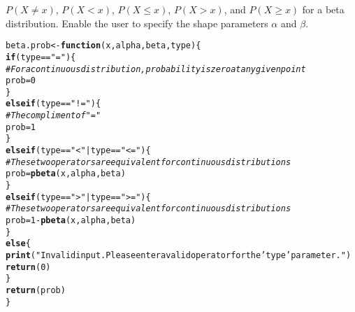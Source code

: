 \documentclass{article}\usepackage[]{graphicx}\usepackage[]{xcolor}
\makeatletter
\newcommand{\hlnum}[1]{\textcolor[rgb]{0.686,0.059,0.569}{#1}}%
\newcommand{\hlsng}[1]{\textcolor[rgb]{0.192,0.494,0.8}{#1}}%
\newcommand{\hlcom}[1]{\textcolor[rgb]{0.678,0.584,0.686}{\textit{#1}}}%
\newcommand{\hlopt}[1]{\textcolor[rgb]{0,0,0}{#1}}%
\newcommand{\hldef}[1]{\textcolor[rgb]{0.345,0.345,0.345}{#1}}%
\newcommand{\hlkwa}[1]{\textcolor[rgb]{0.161,0.373,0.58}{\textbf{#1}}}%
\newcommand{\hlkwb}[1]{\textcolor[rgb]{0.69,0.353,0.396}{#1}}%
\newcommand{\hlkwc}[1]{\textcolor[rgb]{0.333,0.667,0.333}{#1}}%
\newcommand{\hlkwd}[1]{\textcolor[rgb]{0.737,0.353,0.396}{\textbf{#1}}}%
\newenvironment{kframe}{%
 \def\at@end@of@kframe{}%
 \ifinner\ifhmode%
  \def\at@end@of@kframe{\end{minipage}}%
  \begin{minipage}{\columnwidth}%
 \fi\fi%
 \def\FrameCommand##1{\hskip\@totalleftmargin \hskip-\fboxsep
 \colorbox{shadecolor}{##1}\hskip-\fboxsep
     \hskip-\linewidth \hskip-\@totalleftmargin \hskip\columnwidth}%
 \MakeFramed {\advance\hsize-\width
   \@totalleftmargin\z@ \linewidth\hsize
   \@setminipage}}%
 {\par\unskip\endMakeFramed%
 \at@end@of@kframe}
\newenvironment{knitrout}{}{} %
\makeatother
\begin{document}
\begin{enumerate}
    $P(X \neq x)$, $P(X<x)$, $P(X \leq x)$, $P(X > x)$, and $P(X \geq x)$
    for a beta distribution. Enable the user to specify the shape parameters
    $\alpha$ and $\beta$.
\begin{knitrout}\scriptsize
{}\color{fgcolor}\begin{kframe}
\begin{alltt}
\hldef{beta.prob} \hlkwb{<-} \hlkwa{function}\hldef{(}\hlkwc{x}\hldef{,} \hlkwc{alpha}\hldef{,} \hlkwc{beta}\hldef{,} \hlkwc{type}\hldef{)\{}
  \hlkwa{if}\hldef{(type} \hlopt{==} \hlsng{"="}\hldef{)\{}
    \hlcom{#For a continuous distribution, probability is zero at any given point}
    \hldef{prob} \hlkwb{=} \hlnum{0}
  \hldef{\}}
  \hlkwa{else if}\hldef{(type} \hlopt{==} \hlsng{"!="}\hldef{)\{}
    \hlcom{#The compliment of "="}
    \hldef{prob} \hlkwb{=} \hlnum{1}
  \hldef{\}}
  \hlkwa{else if}\hldef{(type} \hlopt{==} \hlsng{"<"} \hlopt{|} \hldef{type} \hlopt{==} \hlsng{"<="}\hldef{)\{}
    \hlcom{#These two operators are equivalent for continuous distributions}
    \hldef{prob} \hlkwb{=} \hlkwd{pbeta}\hldef{(x, alpha, beta)}
  \hldef{\}}
  \hlkwa{else if}\hldef{(type} \hlopt{==} \hlsng{">"} \hlopt{|} \hldef{type} \hlopt{==} \hlsng{">="}\hldef{)\{}
    \hlcom{#These two operators are equivalent for continuous distributions}
    \hldef{prob} \hlkwb{=} \hlnum{1} \hlopt{-} \hlkwd{pbeta}\hldef{(x, alpha, beta)}
  \hldef{\}}
  \hlkwa{else}\hldef{\{}
    \hlkwd{print}\hldef{(}\hlsng{"Invalid input. Please enter a valid operator for the 'type' parameter."}\hldef{)}
    \hlkwd{return}\hldef{(}\hlnum{0}\hldef{)}
  \hldef{\}}
  \hlkwd{return}\hldef{(prob)}
\hldef{\}}
\end{alltt}
\end{kframe}
\end{knitrout}
\end{enumerate}

\end{document}
